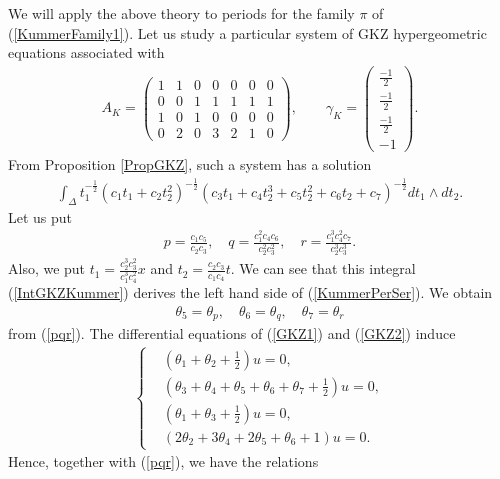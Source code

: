 \documentclass[10pt]{article}
\begin{document}
We will apply the above theory  to periods for the family $\pi$ of   (\ref{KummerFamily1}).
Let us study a particular system of GKZ hypergeometric equations associated with
\begin{align}\label{AGammaK}
A_K
=\begin{pmatrix}
1& 1&0 &0 &0 &0 &0\\
0&0 &1& 1& 1& 1& 1 \\
1& 0&1&0&0&0&0 \\
0&2 &0&3&2&1&0
\end{pmatrix},
\quad\quad
\gamma_K=\begin{pmatrix} \frac{-1}{2} \\ \frac{-1}{2} \\ \frac{-1}{2} \\ -1 \end{pmatrix}.
\end{align}
From Proposition \ref{PropGKZ}, such a system has a solution 
\begin{align}\label{IntGKZKummer}
\int_\Delta t_1^{-\frac{1}{2}} (c_1 t_1 + c_2 t_2^2)^{-\frac{1}{2}}(c_3 t_1 + c_4 t_2^3 + c_5 t_2^2 +c_6 t_2 +c_7)^{-\frac{1}{2}} dt_1 \wedge dt_2.
\end{align}
Let us put
\begin{align}\label{pqr}
p=\frac{c_1 c_5}{c_2 c_3}, \quad q=\frac{c_1^2 c_4 c_6}{c_2^2 c_3^2} ,\quad r=\frac{c_1^3 c_4^2 c_7}{ c_2^3 c_3^3}.
\end{align}
Also, we put
$\displaystyle t_1=\frac{c_2^3 c_3^2}{c_1^3 c_4^2} x$ and $\displaystyle t_2=\frac{c_2 c_3}{c_1 c_4} t$.
We can see that this integral (\ref{IntGKZKummer}) derives the left hand side of (\ref{KummerPerSer}). 
We obtain
\begin{align}\label{thetapqr}
\theta_5=\theta_p,\quad \theta_6=\theta_q,\quad \theta_7=\theta_r
\end{align}
from (\ref{pqr}).
The differential equations  of (\ref{GKZ1}) and (\ref{GKZ2})  induce 
\begin{align}\label{PGKZ12}
\begin{cases}
&(\theta_1 + \theta_2 +\frac{1}{2}  )u=0, \\
& (\theta_3 +\theta_4+\theta_5 + \theta_6 +\theta_7 +\frac{1}{2})u =0, \\
& (\theta_1+\theta_3+\frac{1}{2}) u=0,\\
& (2\theta_2 +3\theta_4+ 2\theta_5 + \theta_6 +1) u=0.
\end{cases}
\end{align}
Hence, together with (\ref{pqr}),
we have the relations
\end{document}
